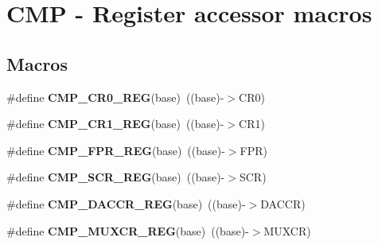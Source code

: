 \hypertarget{group__CMP__Register__Accessor__Macros}{}\section{C\+MP -\/ Register accessor macros}
\label{group__CMP__Register__Accessor__Macros}
\subsection*{Macros}
\begin{DoxyCompactItemize}
\item 
\#define {\bfseries C\+M\+P\+\_\+\+C\+R0\+\_\+\+R\+EG}(base)~((base)-\/$>$C\+R0)\hypertarget{group__CMP__Register__Accessor__Macros_ga027ebf4e2c4654b6e863e070cb299128}{}\label{group__CMP__Register__Accessor__Macros_ga027ebf4e2c4654b6e863e070cb299128}

\item 
\#define {\bfseries C\+M\+P\+\_\+\+C\+R1\+\_\+\+R\+EG}(base)~((base)-\/$>$C\+R1)\hypertarget{group__CMP__Register__Accessor__Macros_gaccbe9acfec0cbe3a83f7331f899f3240}{}\label{group__CMP__Register__Accessor__Macros_gaccbe9acfec0cbe3a83f7331f899f3240}

\item 
\#define {\bfseries C\+M\+P\+\_\+\+F\+P\+R\+\_\+\+R\+EG}(base)~((base)-\/$>$F\+PR)\hypertarget{group__CMP__Register__Accessor__Macros_gac3a57bc4a8faf059f7271bca5af68846}{}\label{group__CMP__Register__Accessor__Macros_gac3a57bc4a8faf059f7271bca5af68846}

\item 
\#define {\bfseries C\+M\+P\+\_\+\+S\+C\+R\+\_\+\+R\+EG}(base)~((base)-\/$>$S\+CR)\hypertarget{group__CMP__Register__Accessor__Macros_ga678da61cf26cf0494da5f50012b39a88}{}\label{group__CMP__Register__Accessor__Macros_ga678da61cf26cf0494da5f50012b39a88}

\item 
\#define {\bfseries C\+M\+P\+\_\+\+D\+A\+C\+C\+R\+\_\+\+R\+EG}(base)~((base)-\/$>$D\+A\+C\+CR)\hypertarget{group__CMP__Register__Accessor__Macros_ga5b7c17c68ee9198e701deff8f750ca2b}{}\label{group__CMP__Register__Accessor__Macros_ga5b7c17c68ee9198e701deff8f750ca2b}

\item 
\#define {\bfseries C\+M\+P\+\_\+\+M\+U\+X\+C\+R\+\_\+\+R\+EG}(base)~((base)-\/$>$M\+U\+X\+CR)\hypertarget{group__CMP__Register__Accessor__Macros_gaf82bcece4b697f01171a785589591a8c}{}\label{group__CMP__Register__Accessor__Macros_gaf82bcece4b697f01171a785589591a8c}


\end{DoxyCompactItemize}
